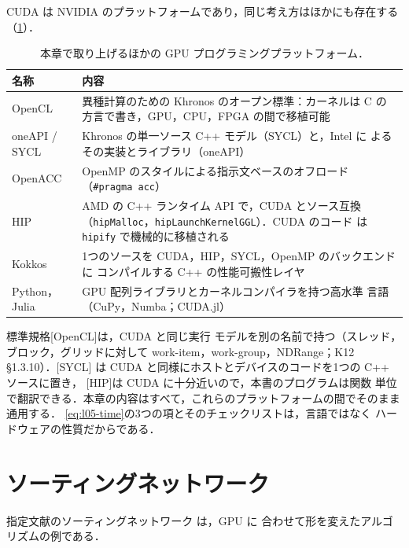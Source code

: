 \documentclass[../main.tex]{subfiles}
\begin{document}
CUDA は NVIDIA のプラットフォームであり，同じ考え方はほかにも存在する
（\cref{tab:l05-platforms}）．

\begin{table}[tb]
  \centering
  \small
  \caption{本章で取り上げるほかの GPU プログラミングプラットフォーム．}
  \label{tab:l05-platforms}
  \begin{tabular}{>{\raggedright\arraybackslash}p{22mm}
                  >{\raggedright\arraybackslash}p{84mm}}
    \toprule
    名称 & 内容 \\
    \midrule
    OpenCL & 異種計算のための Khronos のオープン標準：カーネルは C の
      方言で書き，GPU，CPU，FPGA の間で移植可能 \\
    oneAPI / SYCL & Khronos の単一ソース C++ モデル（SYCL）と，Intel に
      よるその実装とライブラリ（oneAPI） \\
    OpenACC & OpenMP のスタイルによる指示文ベースのオフロード
      （\texttt{\#pragma acc}） \\
    HIP & AMD の C++ ランタイム API で，CUDA とソース互換
      （\texttt{hipMalloc}，\texttt{hipLaunchKernelGGL}）．CUDA のコード
      は \texttt{hipify} で機械的に移植される \\
    Kokkos & 1つのソースを CUDA，HIP，SYCL，OpenMP のバックエンドに
      コンパイルする C++ の性能可搬性レイヤ \\
    Python，Julia & GPU 配列ライブラリとカーネルコンパイラを持つ高水準
      言語（CuPy，Numba；CUDA.jl） \\
    \bottomrule
  \end{tabular}
\end{table}

標準規格[OpenCL]は，CUDA と同じ実行
モデルを別の名前で持つ（スレッド，ブロック，グリッドに対して
work-item，work-group，NDRange；K12 §1.3.10）．[SYCL]
は CUDA と同様にホストとデバイスのコードを1つの C++ ソースに置き，
[HIP]は CUDA に十分近いので，本書のプログラムは関数
単位で翻訳できる．本章の内容はすべて，これらのプラットフォームの間でそのまま通用する．
\cref{eq:l05-time}の3つの項とそのチェックリストは，言語ではなく
ハードウェアの性質だからである．

\section{ソーティングネットワーク}
\label{sec:l05-sorting}

指定文献のソーティングネットワーク \cite{kipfer2005gpusort} は，GPU に
合わせて形を変えたアルゴリズムの例である．
\end{document}
